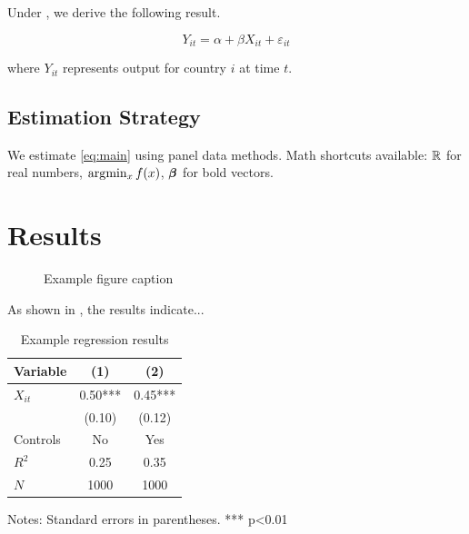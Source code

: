 \documentclass[12pt, draft, colorlinks, doublespace]{bp-article}
\begin{document}
Under , we derive the following result.

\begin{equation} \label{eq:main}
    Y_{it} = \alpha + \beta X_{it} + \varepsilon_{it}
\end{equation}

where $Y_{it}$ represents output for country $i$ at time $t$.

\subsection{Estimation Strategy} \label{subsec:estimation}

We estimate \cref{eq:main} using panel data methods.
Math shortcuts available: $\mathbb{R}$ for real numbers, $\arg\!\min_{x} f(x)$, $\boldsymbol{\beta}$ for bold vectors.


\section{Results} \label{sec:results}

\begin{figure}[htbp]
    \centering
    \caption{Example figure caption}
    \label{fig:example}
\end{figure}

As shown in , the results indicate...

\begin{table}[htbp]
    \centering
    \caption{Example regression results}
    \label{tab:results}
    \begin{tabular}{lcc}
        \toprule
        Variable & (1) & (2) \\
        \midrule
        $X_{it}$ & 0.50*** & 0.45*** \\
                 & (0.10)  & (0.12) \\
        Controls & No & Yes \\
        \midrule
        $R^2$ & 0.25 & 0.35 \\
        $N$ & 1000 & 1000 \\
        \bottomrule
    \end{tabular}
    \begin{tablenotes}
        \small
        \item Notes: Standard errors in parentheses. *** p<0.01
    \end{tablenotes}
\end{table}
\end{document}
